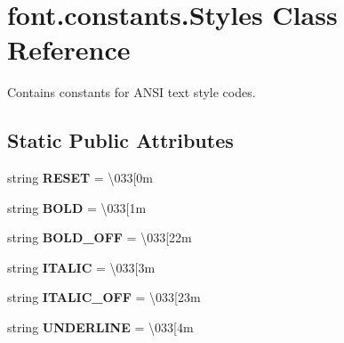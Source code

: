 \hypertarget{classfont_1_1constants_1_1Styles}{}\section{font.\+constants.\+Styles Class Reference}
\label{classfont_1_1constants_1_1Styles}


Contains constants for A\+N\+SI text style codes.  


\subsection*{Static Public Attributes}
\begin{DoxyCompactItemize}
\item 
string {\bfseries R\+E\+S\+ET} = \textquotesingle{}\textbackslash{}033\mbox{[}0m\textquotesingle{}\hypertarget{classfont_1_1constants_1_1Styles_ad29d2bc2798787e0440842fb4a481fb6}{}\label{classfont_1_1constants_1_1Styles_ad29d2bc2798787e0440842fb4a481fb6}

\item 
string {\bfseries B\+O\+LD} = \textquotesingle{}\textbackslash{}033\mbox{[}1m\textquotesingle{}\hypertarget{classfont_1_1constants_1_1Styles_a0f0afd96809e2254562ac6cc0fe119ab}{}\label{classfont_1_1constants_1_1Styles_a0f0afd96809e2254562ac6cc0fe119ab}

\item 
string {\bfseries B\+O\+L\+D\+\_\+\+O\+FF} = \textquotesingle{}\textbackslash{}033\mbox{[}22m\textquotesingle{}\hypertarget{classfont_1_1constants_1_1Styles_a574cd81c9ce162e8d28e10c8da5f7c88}{}\label{classfont_1_1constants_1_1Styles_a574cd81c9ce162e8d28e10c8da5f7c88}

\item 
string {\bfseries I\+T\+A\+L\+IC} = \textquotesingle{}\textbackslash{}033\mbox{[}3m\textquotesingle{}\hypertarget{classfont_1_1constants_1_1Styles_a055d7fd4d1d90090fe3b628353e1dd26}{}\label{classfont_1_1constants_1_1Styles_a055d7fd4d1d90090fe3b628353e1dd26}

\item 
string {\bfseries I\+T\+A\+L\+I\+C\+\_\+\+O\+FF} = \textquotesingle{}\textbackslash{}033\mbox{[}23m\textquotesingle{}\hypertarget{classfont_1_1constants_1_1Styles_a38293343c5f14e2a1a055b64532f2e3d}{}\label{classfont_1_1constants_1_1Styles_a38293343c5f14e2a1a055b64532f2e3d}

\item 
string {\bfseries U\+N\+D\+E\+R\+L\+I\+NE} = \textquotesingle{}\textbackslash{}033\mbox{[}4m\textquotesingle{}\hypertarget{classfont_1_1constants_1_1Styles_a3c88ee0f4b74663abb8336057ce907b8}{}\label{classfont_1_1constants_1_1Styles_a3c88ee0f4b74663abb8336057ce907b8}


\end{DoxyCompactItemize}

